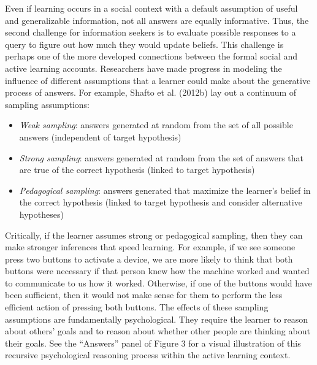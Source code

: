 \documentclass[oneside]{report}
\begin{document}
Even if learning occurs in a social context with a default assumption of
useful and generalizable information, not all answers are equally
informative. Thus, the second challenge for information seekers is to
evaluate possible responses to a query to figure out how much they would
update beliefs. This challenge is perhaps one of the more developed
connections between the formal social and active learning accounts.
Researchers have made progress in modeling the influence of different
assumptions that a learner could make about the generative process of
answers. For example, Shafto et al. (2012b) lay out a continuum of
sampling assumptions:
\begin{itemize}
\tightlist
\item
  \emph{Weak sampling}: answers generated at random from the set of all
  possible answers (independent of target hypothesis)
\item
  \emph{Strong sampling}: answers generated at random from the set of
  answers that are true of the correct hypothesis (linked to target
  hypothesis)
\item
  \emph{Pedagogical sampling}: answers generated that maximize the
  learner's belief in the correct hypothesis (linked to target
  hypothesis and consider alternative hypotheses)
\end{itemize}
\noindent
Critically, if the learner assumes strong or pedagogical sampling, then
they can make stronger inferences that speed learning. For example, if
we see someone press two buttons to activate a device, we are more
likely to think that both buttons were necessary if that person knew how
the machine worked and wanted to communicate to us how it worked.
Otherwise, if one of the buttons would have been sufficient, then it
would not make sense for them to perform the less efficient action of
pressing both buttons. The effects of these sampling assumptions are
fundamentally psychological. They require the learner to reason about
others' goals and to reason about whether other people are thinking
about their goals. See the ``Answers'' panel of Figure 3 for a visual
illustration of this recursive psychological reasoning process within
the active learning context.
\end{document}
